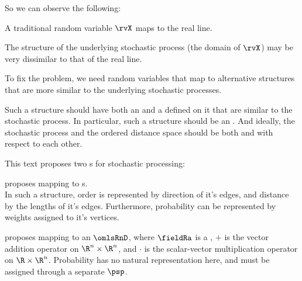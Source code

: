 So we can observe the following:
\begin{enume}
  \item A traditional random variable $\rvX$ maps to the real line.
  \item The structure of the underlying stochastic process (the domain of $\rvX$) may be very dissimilar to that of the real line.
  \item To fix the problem, we need random variables that map to alternative structures that are more similar to the underlying stochastic processes.
  \item Such a structure should have both an  and a  defined on it
        that are similar to the stochastic process. In particular, such a structure should be an 
        . And ideally, the stochastic process and the ordered distance space should be 
        both  and  with respect to each other.
\end{enume}

This text proposes two s for stochastic processing:

\begin{minipage}{\tw-50mm}
    \imarks {} proposes mapping to s.\\
    In such a structure, order is represented by direction of it's edges,
    and distance by the lengths of it's edges.
    Furthermore, probability can be represented by weights assigned to it's vertices.
\end{minipage}\quad{}

\begin{minipage}{\tw-50mm}
  \imarks {} proposes mapping to an  
  $\omlsRnD$, where $\fieldRa$ is a , 
  $+$ is the vector addition operator on $\R^n\times\R^n$, 
  and $\cdot$ is the scalar-vector multiplication operator on $\R\times\R^n$.
  Probability has no natural representation here, and must be assigned through a separate 
   $\psp$.
\end{minipage}\quad{}%



